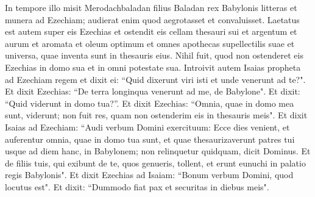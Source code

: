 \begin{biblechapter}  
\verse In tempore illo misit Merodachbaladan filius Baladan rex Babylonis litteras et munera ad Ezechiam; audierat enim quod aegrotasset et convaluisset. 
\verse Laetatus est autem super eis Ezechias et ostendit eis cellam thesauri sui et argentum et aurum et aromata et oleum optimum et omnes apothecas supellectilis suae et universa, quae inventa sunt in thesauris eius. Nihil fuit, quod non ostenderet eis Ezechias in domo sua et in omni potestate sua. 
\verse Introivit autem Isaias propheta ad Ezechiam regem et dixit ei: “Quid dixerunt viri isti et unde venerunt ad te?". Et dixit Ezechias: “De terra longinqua venerunt ad me, de Babylone". 
\verse Et dixit: “Quid viderunt in domo tua?”. Et dixit Ezechias: “Omnia, quae in domo mea sunt, viderunt; non fuit res, quam non ostenderim eis in thesauris meis". 
\verse Et dixit Isaias ad Ezechiam: “Audi verbum Domini exercituum: 
\verse Ecce dies venient, et auferentur omnia, quae in domo tua sunt, et quae thesaurizaverunt patres tui usque ad diem hanc, in Babylonem; non relinquetur quidquam, dicit Dominus. 
\verse Et de filiis tuis, qui exibunt de te, quos genueris, tollent, et erunt eunuchi in palatio regis Babylonis". 
\verse Et dixit Ezechias ad Isaiam: “Bonum verbum Domini, quod locutus est". Et dixit: “Dummodo fiat pax et securitas in diebus meis". 
\end{biblechapter}

